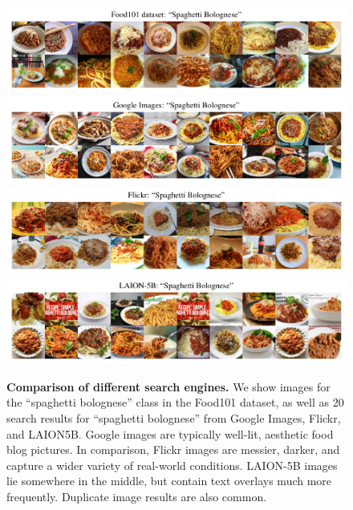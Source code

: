 \begin{figure}
    \centering
    \includegraphics{figures/food-spaghetti.pdf} \\
    \includegraphics{figures/google-spaghetti.pdf} \\
    \includegraphics{figures/flickr-spaghetti.pdf} \\
    \includegraphics{figures/laion5b-spaghetti.pdf} 
    \caption{\textbf{Comparison of different search engines.} We show images for the ``spaghetti bolognese'' class in the Food101 dataset, as well as 20 search results for ``spaghetti bolognese'' from Google Images, Flickr, and LAION5B. Google images are typically well-lit, aesthetic food blog pictures. In comparison, Flickr images are messier, darker, and capture a wider variety of real-world conditions. LAION-5B images lie somewhere in the middle, but contain text overlays much more frequently. Duplicate image results are also common.}
    \label{fig:data_comparison}
\end{figure}

